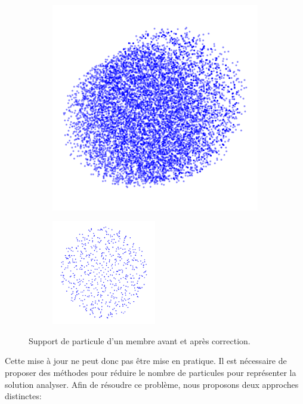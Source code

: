 \begin{figure}~\label{fig:support_particles}
    \centering
    \begin{subfigure}{0.5\textwidth}
        \includegraphics[width=\textwidth]{./images/all_particles.pdf}
    \end{subfigure}
    \begin{subfigure}{0.5\textwidth}
        \includegraphics[width=0.5\textwidth]{./images/memb_particles.pdf}
    \end{subfigure}
    \caption{Support de particule d'un membre avant et après correction.}
\end{figure}

Cette mise à jour ne peut donc pas être mise en pratique. Il est nécessaire de proposer des méthodes pour réduire le nombre de particules pour représenter la solution analyser. Afin de résoudre ce problème, nous proposons deux approches distinctes:

